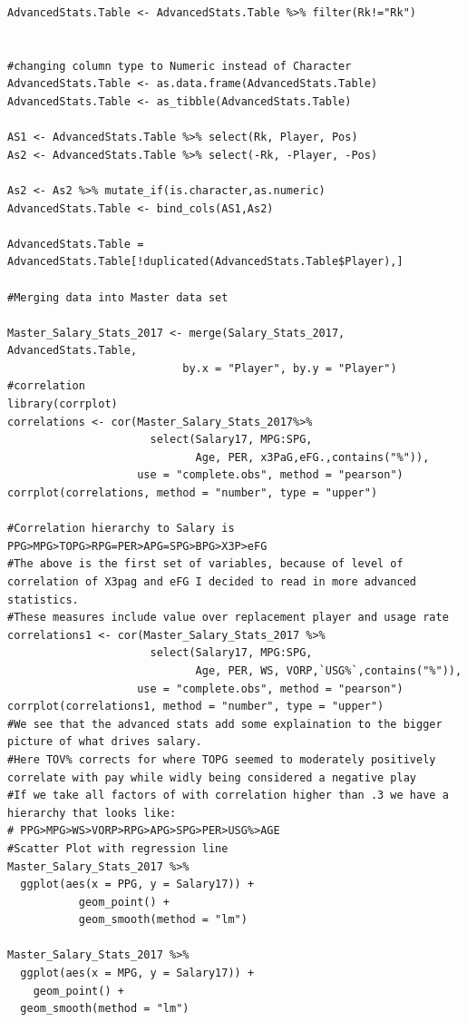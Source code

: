 \documentclass[12pt,english]{article}
\begin{document}
\begin{singlespace}
\begin{lstlisting}
AdvancedStats.Table <- AdvancedStats.Table %>% filter(Rk!="Rk")


#changing column type to Numeric instead of Character
AdvancedStats.Table <- as.data.frame(AdvancedStats.Table)
AdvancedStats.Table <- as_tibble(AdvancedStats.Table)

AS1 <- AdvancedStats.Table %>% select(Rk, Player, Pos)
As2 <- AdvancedStats.Table %>% select(-Rk, -Player, -Pos)

As2 <- As2 %>% mutate_if(is.character,as.numeric)
AdvancedStats.Table <- bind_cols(AS1,As2)

AdvancedStats.Table = AdvancedStats.Table[!duplicated(AdvancedStats.Table$Player),]

#Merging data into Master data set

Master_Salary_Stats_2017 <- merge(Salary_Stats_2017, AdvancedStats.Table,
                           by.x = "Player", by.y = "Player")
#correlation 
library(corrplot)
correlations <- cor(Master_Salary_Stats_2017%>%
                      select(Salary17, MPG:SPG,
                             Age, PER, x3PaG,eFG.,contains("%")),
                    use = "complete.obs", method = "pearson")
corrplot(correlations, method = "number", type = "upper")
       
#Correlation hierarchy to Salary is PPG>MPG>TOPG>RPG=PER>APG=SPG>BPG>X3P>eFG
#The above is the first set of variables, because of level of correlation of X3pag and eFG I decided to read in more advanced statistics.
#These measures include value over replacement player and usage rate
correlations1 <- cor(Master_Salary_Stats_2017 %>%
                      select(Salary17, MPG:SPG,
                             Age, PER, WS, VORP,`USG%`,contains("%")),
                    use = "complete.obs", method = "pearson")
corrplot(correlations1, method = "number", type = "upper")
#We see that the advanced stats add some explaination to the bigger picture of what drives salary.
#Here TOV% corrects for where TOPG seemed to moderately positively correlate with pay while widly being considered a negative play
#If we take all factors of with correlation higher than .3 we have a hierarchy that looks like:
# PPG>MPG>WS>VORP>RPG>APG>SPG>PER>USG%>AGE
#Scatter Plot with regression line
Master_Salary_Stats_2017 %>%
  ggplot(aes(x = PPG, y = Salary17)) + 
           geom_point() +
           geom_smooth(method = "lm")

Master_Salary_Stats_2017 %>%
  ggplot(aes(x = MPG, y = Salary17)) +
    geom_point() +
  geom_smooth(method = "lm")


\end{lstlisting}
\end{singlespace}
\end{document}
